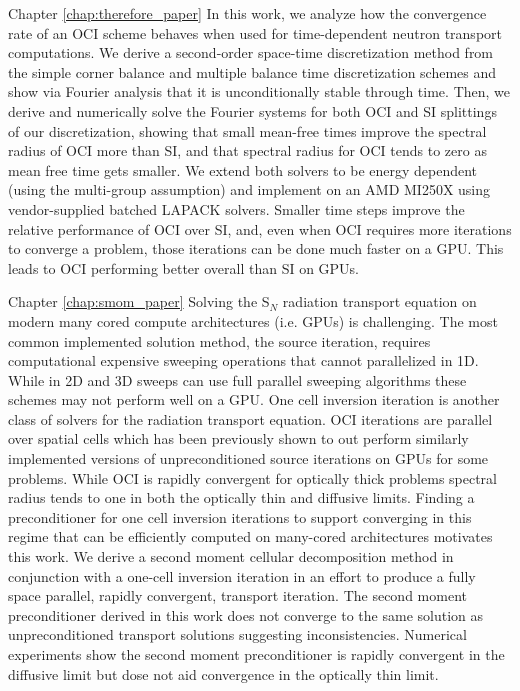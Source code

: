 Chapter \ref{chap:therefore_paper}
In this work, we analyze how the convergence rate of an OCI scheme behaves when used for time-dependent neutron transport computations.
We derive a second-order space-time discretization method from the simple corner balance and multiple balance time discretization schemes and show via Fourier analysis that it is unconditionally stable through time.
Then, we derive and numerically solve the Fourier systems for both OCI and SI splittings of our discretization, showing that small mean-free times improve the spectral radius of OCI more than SI, and that spectral radius for OCI tends to zero as mean free time gets smaller.
We extend both solvers to be energy dependent (using the multi-group assumption) and implement on an AMD MI250X using vendor-supplied batched LAPACK solvers.
Smaller time steps improve the relative performance of OCI over SI, and, even when OCI requires more iterations to converge a problem, those iterations can be done much faster on a GPU.
This leads to OCI performing better overall than SI on GPUs.


Chapter \ref{chap:smom_paper}
Solving the S$_N$ radiation transport equation on modern many cored compute architectures (i.e. GPUs) is challenging.
The most common implemented solution method, the source iteration, requires computational expensive sweeping operations that cannot parallelized in 1D.
While in 2D and 3D sweeps can use full parallel sweeping algorithms these schemes may not perform well on a GPU.
One cell inversion iteration is another class of solvers for the radiation transport equation.
OCI iterations are parallel over spatial cells which has been previously shown to out perform similarly implemented versions of unpreconditioned source iterations on GPUs for some problems.
While OCI is rapidly convergent for optically thick problems spectral radius tends to one in both the optically thin and diffusive limits.
Finding a preconditioner for one cell inversion iterations to support converging in this regime that can be efficiently computed on many-cored architectures motivates this work.
We derive a second moment cellular decomposition method in conjunction with a one-cell inversion iteration in an effort to produce a fully space parallel, rapidly convergent, transport iteration.
The second moment preconditioner derived in this work does not converge to the same solution as unpreconditioned transport solutions suggesting inconsistencies.
Numerical experiments show the second moment preconditioner is rapidly convergent in the diffusive limit but dose not aid convergence in the optically thin limit.




